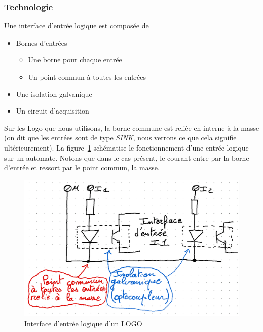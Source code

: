 \documentclass[11pt]{article}
\begin{document}
\subsubsection{Technologie}
Une interface d'entrée logique est composée de 
\begin{itemize}
	\item Bornes d'entrées
	\begin{itemize}
		\item Une borne pour chaque entrée
		\item Un point commun à toutes les entrées
	\end{itemize}
	\item Une isolation galvanique
	\item Un circuit d'acquisition
\end{itemize}

Sur les Logo que nous utilisons, la borne commune est reliée en interne à la masse (on dit que les entrées sont de type \textit{SINK}, nous verrons ce que cela signifie ultérieurement). La figure~\ref{fig:entreeLogo} schématise le fonctionnement d'une entrée logique sur un automate. Notons que dans le cas présent, le courant entre par la borne d'entrée et ressort par le point commun, la masse. 

\begin{figure}
	\centering
	\includegraphics[width=.8\textwidth]{images/C04-interneLogo.png}
	\caption{Interface d'entrée logique d'un LOGO}
	\label{fig:entreeLogo}
\end{figure}
\pagebreak
\end{document}
